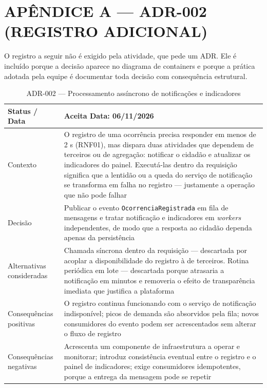 \documentclass[12pt,a4paper,oneside]{article}
\newcommand{\fonte}[1]{\par\vspace{5pt}{\footnotesize\singlespacing Fonte: #1\par}}
\newcommand{\cab}[1]{\textbf{\footnotesize #1}}
\begin{document}
\newpage
{}
{}
\section*{APÊNDICE A — ADR-002 (REGISTRO ADICIONAL)}
\vspace{0.6\baselineskip}

O registro a seguir não é exigido pela atividade, que pede um ADR. Ele é
incluído porque a decisão aparece no diagrama de containers e porque a prática
adotada pela equipe é documentar toda decisão com consequência estrutural.

\begin{table}[H]
\centering
\caption{ADR-002 — Processamento assíncrono de notificações e indicadores}
\label{tab:adr2}
{\small\singlespacing
\begin{tabularx}{\textwidth}{L{3.4cm} X}
\toprule
\cab{Status / Data} & \textbf{Aceita} \quad Data: 06/11/2026 \\
\midrule
Contexto & O registro de uma ocorrência precisa responder em menos de 2 s
(RNF01), mas dispara duas atividades que dependem de terceiros ou de agregação:
notificar o cidadão e atualizar os indicadores do painel. Executá-las dentro da
requisição significa que a lentidão ou a queda do serviço de notificação se
transforma em falha no registro — justamente a operação que não pode falhar \\
\addlinespace
Decisão & Publicar o evento \texttt{OcorrenciaRegistrada} em fila de mensagens e
tratar notificação e indicadores em \emph{workers} independentes, de modo que a
resposta ao cidadão dependa apenas da persistência \\
\addlinespace
Alternativas consideradas & Chamada síncrona dentro da requisição — descartada
por acoplar a disponibilidade do registro à de terceiros. Rotina periódica em
lote — descartada porque atrasaria a notificação em minutos e removeria o efeito
de transparência imediata que justifica a plataforma \\
\addlinespace
Consequências positivas & O registro continua funcionando com o serviço de
notificação indisponível; picos de demanda são absorvidos pela fila; novos
consumidores do evento podem ser acrescentados sem alterar o fluxo de registro \\
\addlinespace
Consequências negativas & Acrescenta um componente de infraestrutura a operar e
monitorar; introduz consistência eventual entre o registro e o painel de
indicadores; exige consumidores idempotentes, porque a entrega da mensagem pode
se repetir \\
\bottomrule
\end{tabularx}}
\fonte{elaborado pelos autores (2026), conforme o modelo de Nygard (2011).}
\end{table}
\end{document}
